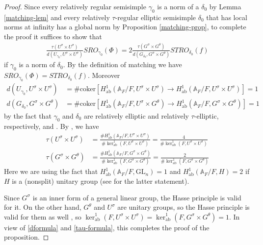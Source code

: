 \documentclass[12pt]{amsart}
\theoremstyle{remark}
\numberwithin{equation}{section}
\newcommand{\A}{\mathbb{A}}
\newcommand{\GL}{\mathrm{GL}}
\theoremstyle{definition}
\numberwithin{equation}{subsection}
\begin{document}
\begin{proof}
Since every relatively regular semisimple $\gamma_0$ is a norm of a $\delta_0$ by Lemma \ref{matching-lem} and
 every relatively $\tau$-regular elliptic semisimple $\delta_0$ that has local norms at infinity has a global norm by Proposition \ref{matching-prop}, to complete the proof it suffices to show that
\begin{align} \label{eq123}
\frac{\tau(U^{\sigma} \times U^{\sigma})}{d(U_{\gamma_0},U^{\sigma} \times U^{\sigma})}
SRO_{\gamma_0}(\Phi)=2\frac{\tau(G^{\sigma}  \times G^{\theta})}{d(G_{\delta_0},G^{\sigma} \times G^{\theta})}
STRO_{\delta_0}(f)
\end{align}
if $\gamma_0$ is a norm of $\delta_0$.  By the definition of matching we have
$SRO_{\gamma_0}(\Phi)=STRO_{\delta_0}(f)$. Moreover
\begin{align}\label{dformula}
d(U_{\gamma_0},U^{\sigma} \times U^{\sigma})&=\#\mathrm{coker}\left[H^1_{\mathrm{ab}}(\A_F/F,U^{\sigma} \times U^{\sigma}) \to H^1_{\mathrm{ab}}(\A_F/F,U^{\sigma}\times U^{\sigma})\right]=1\\
d(G_{\delta_0},G^{\sigma} \times G^{\theta})&=\# \mathrm{coker}\left[  H^1_{\mathrm{ab}}(\A_F/F,U^{\sigma} \times G^{\theta}) \to H^1_{\mathrm{ab}}(\A_F/F,G^{\sigma} \times G^{\theta})\right] =1 \nonumber
\end{align}
by the fact that $\gamma_0$ and $\delta_0$ are relatively elliptic and relatively $\tau$-elliptic, respectively, and \cite[Corollaire 1.9.3]{Lab}.  By \cite[Corollaire 1.7.4]{Lab}, we have
\begin{align}\label{tau-formula}
\tau(U^{\sigma} \times U^{\sigma})&=\frac{\# H^1_{\mathrm{ab}}(\A_F/F, U^{\sigma} \times U^{\sigma})}{\#\ker^1_{\mathrm{ab}}(F,U^{\sigma} \times U^{\sigma})}=\frac{4}{\#\ker^1_{\mathrm{ab}}(F,U^{\sigma} \times U^{\sigma})}\\ \tau(G^{\sigma} \times G^{\theta})&=\frac{\#H^1_{\mathrm{ab}}(\A_F/F,G^{\sigma} \times G^{\theta})}{\#\ker^1_{\mathrm{ab}}(F,G^{\sigma} \times G^{\theta})}=\frac{2}{\#\ker^1_{\mathrm{ab}}(F,G^{\sigma} \times G^{\theta})} \nonumber
\end{align}
Here we are using the fact that $H^1_{\mathrm{ab}}(\A_F/F,\GL_n)=1$ and $H^1_{\mathrm{ab}}(\A_F/F,H)=2$ if $H$ is a (nonsplit) unitary group (see \cite[Lemma 1.2.1(i)]{HarLab} for the latter statement).


  Since $G^{\sigma}$ is an inner form of a general linear group, the Hasse principle is valid for it.  On the other hand, $G^{\theta}$ and $U^{\sigma}$ are unitary groups, so the Hasse principle is valid for them as well \cite[Lemma 1.2.1(i)]{HarLab}, so $\ker^1_{\mathrm{ab}}(F,U^{\sigma} \times U^{\sigma})=\ker^1_{\mathrm{ab}}(F,G^{\sigma} \times G^{\theta})=1$.  In view of \eqref{dformula} and \eqref{tau-formula}, this completes the proof of the proposition.
\end{proof}
\end{document}

